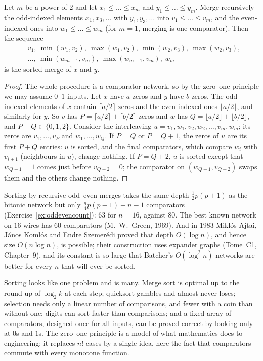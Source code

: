 \begin{theorem}\label{thm:oddeven}
Let $m$ be a power of $2$ and let $x_1\le\dots\le x_m$ and $y_1\le\dots\le y_m$. Merge recursively the odd-indexed elements $x_1,x_3,\dots$ with $y_1,y_3,\dots$ into $v_1\le\dots\le v_m$, and the
even-indexed ones into $w_1\le\dots\le w_m$ (for $m=1$, merging is one comparator). Then the sequence
\[
\begin{aligned}
&v_1,\ \min(w_1,v_2),\ \max(w_1,v_2),\ \min(w_2,v_3),\ \max(w_2,v_3),\\&\dots,\ \min(w_{m-1},v_m),\ \max(w_{m-1},v_m),\ w_m
\end{aligned}
\]
is the sorted merge of $x$ and $y$.
\end{theorem}
\begin{proof}
The whole procedure is a comparator network, so by the zero--one principle we may assume $0$--$1$ inputs. Let $x$ have $a$ zeros and $y$ have $b$ zeros. The odd-indexed elements of $x$
contain $\lceil a/2\rceil$ zeros and the even-indexed ones $\lfloor a/2\rfloor$, and similarly for $y$. So $v$ has $P=\lceil a/2\rceil+\lceil b/2\rceil$ zeros and $w$ has $Q=\lfloor a/2\rfloor+\lfloor b/2\rfloor$, and
$P-Q\in\{0,1,2\}$. Consider the interleaving $u=v_1,w_1,v_2,w_2,\dots,v_m,w_m$; its zeros are $v_1,\dots,v_P$ and $w_1,\dots,w_Q$. If $P=Q$ or $P=Q+1$, the zeros of $u$ are its first
$P+Q$ entries: $u$ is sorted, and the final comparators, which compare $w_i$ with $v_{i+1}$ (neighbours in $u$), change nothing. If $P=Q+2$, $u$ is sorted except that
$w_{Q+1}=1$ comes just before $v_{Q+2}=0$; the comparator on $(w_{Q+1},v_{Q+2})$ swaps them and the others change nothing.
\end{proof}

Sorting by recursive odd--even merges takes the same depth $\frac12p(p+1)$ as the bitonic network but only $\frac n4p(p-1)+n-1$ comparators (Exercise~\ref{ex:oddevencount}): $63$ for
$n=16$, against $80$. The best known network on $16$ wires has $60$ comparators (M.~W.~Green, 1969). And in 1983 Mikl\'os Ajtai, J\'anos Koml\'os and Endre Szemer\'edi proved that
depth $O(\log n)$, and hence size $O(n\log n)$, is possible; their construction uses expander graphs (Tome~C1, Chapter~9), and its constant is so large that Batcher's
$O(\log^2n)$ networks are better for every $n$ that will ever be sorted.

\begin{beauty}
Sorting looks like one problem and is many. Merge sort is optimal up to the round-up of $\log_2k$ at each step; quicksort gambles and almost never loses; selection
needs only a linear number of comparisons, and fewer with a coin than without one; digits can sort faster than comparisons; and a fixed array of comparators,
designed once for all inputs, can be proved correct by looking only at $0$s and $1$s. The zero--one principle is a model of what mathematics does to engineering: it
replaces $n!$ cases by a single idea, here the fact that comparators commute with every monotone function.
\end{beauty}

